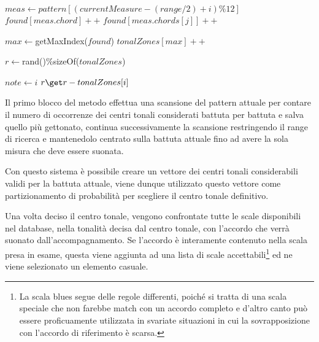 \begin{algorithm}
\caption{}
\label{algo-director-tzone}
\begin{algorithmic}[1]
			\State $meas \gets pattern[(currentMeasure - (range/2) + i) \% 12]$
				\State $found[meas.chord] ++$
			\Else
				 	\State $found[meas.chords[j]] ++$
				\EndFor
			\EndIf
		\EndFor
		
		\State $max \gets $getMaxIndex($found$)
		\State $tonalZones[max] ++$
		
	\EndFor
	
	\State $r \gets $rand()$ \% $sizeOf($tonalZones$)
	
				\State $note \gets i$
				\Break
			\Else
				\State $r \get r - tonalZones[i]$
			\EndIf
		\EndIf
	\EndFor
\EndFunction
\end{algorithmic}
\end{algorithm}

Il primo blocco del metodo effettua una scansione del pattern attuale per contare il numero di occorrenze dei centri tonali considerati battuta per battuta e salva quello più gettonato, continua successivamente la scansione restringendo il range di ricerca e mantenedolo centrato sulla battuta attuale fino ad avere la sola misura che deve essere suonata.

Con questo sistema è possibile creare un vettore dei centri tonali considerabili validi per la battuta attuale, viene dunque utilizzato questo vettore come partizionamento di probabilità per scegliere il centro tonale definitivo.

Una volta deciso il centro tonale, vengono confrontate tutte le scale disponibili nel database, nella tonalità decisa dal centro tonale, con l'accordo che verrà suonato dall'accompagnamento. Se l'accordo è interamente contenuto nella scala presa in esame, questa viene aggiunta ad una lista di scale accettabili\footnote{La scala blues segue delle regole differenti, poiché si tratta di una scala speciale che non farebbe match con un accordo completo e d'altro canto può essere proficuamente utilizzata in svariate situazioni in cui la sovrapposizione con l'accordo di riferimento è scarsa.} ed ne viene selezionato un elemento casuale.

